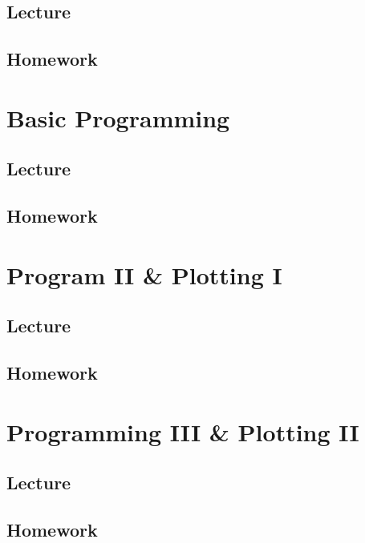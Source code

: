 \documentclass[openany]{book}
\begin{document}
\section{Lecture}

\section{Homework}



\chapter{Basic Programming}
\section{Lecture}

\section{Homework}



\chapter{Program II \& Plotting I}
\section{Lecture}

\section{Homework}



\chapter{Programming III \& Plotting II}
\section{Lecture}

\section{Homework}






\end{document}
